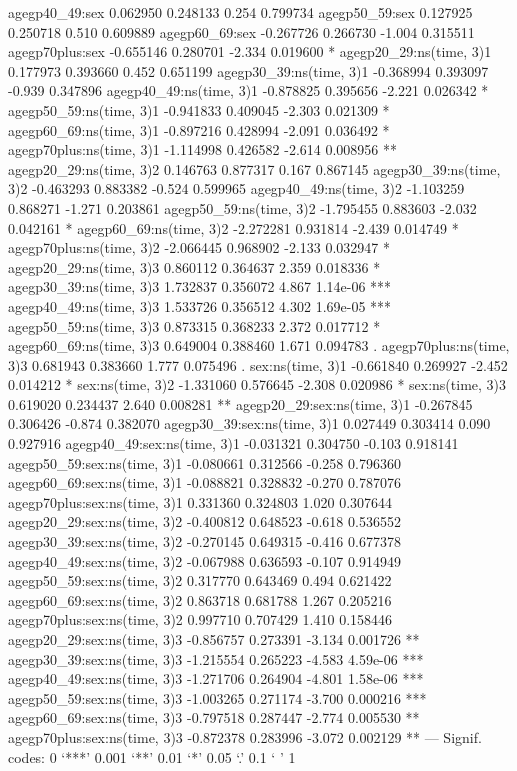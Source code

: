 \documentclass[a4paper]{article}                %
\begin{document}
\begin{Schunk}
\begin{Soutput}
agegp40_49:sex                  0.062950   0.248133   0.254 0.799734    
agegp50_59:sex                  0.127925   0.250718   0.510 0.609889    
agegp60_69:sex                 -0.267726   0.266730  -1.004 0.315511    
agegp70plus:sex                -0.655146   0.280701  -2.334 0.019600 *  
agegp20_29:ns(time, 3)1         0.177973   0.393660   0.452 0.651199    
agegp30_39:ns(time, 3)1        -0.368994   0.393097  -0.939 0.347896    
agegp40_49:ns(time, 3)1        -0.878825   0.395656  -2.221 0.026342 *  
agegp50_59:ns(time, 3)1        -0.941833   0.409045  -2.303 0.021309 *  
agegp60_69:ns(time, 3)1        -0.897216   0.428994  -2.091 0.036492 *  
agegp70plus:ns(time, 3)1       -1.114998   0.426582  -2.614 0.008956 ** 
agegp20_29:ns(time, 3)2         0.146763   0.877317   0.167 0.867145    
agegp30_39:ns(time, 3)2        -0.463293   0.883382  -0.524 0.599965    
agegp40_49:ns(time, 3)2        -1.103259   0.868271  -1.271 0.203861    
agegp50_59:ns(time, 3)2        -1.795455   0.883603  -2.032 0.042161 *  
agegp60_69:ns(time, 3)2        -2.272281   0.931814  -2.439 0.014749 *  
agegp70plus:ns(time, 3)2       -2.066445   0.968902  -2.133 0.032947 *  
agegp20_29:ns(time, 3)3         0.860112   0.364637   2.359 0.018336 *  
agegp30_39:ns(time, 3)3         1.732837   0.356072   4.867 1.14e-06 ***
agegp40_49:ns(time, 3)3         1.533726   0.356512   4.302 1.69e-05 ***
agegp50_59:ns(time, 3)3         0.873315   0.368233   2.372 0.017712 *  
agegp60_69:ns(time, 3)3         0.649004   0.388460   1.671 0.094783 .  
agegp70plus:ns(time, 3)3        0.681943   0.383660   1.777 0.075496 .  
sex:ns(time, 3)1               -0.661840   0.269927  -2.452 0.014212 *  
sex:ns(time, 3)2               -1.331060   0.576645  -2.308 0.020986 *  
sex:ns(time, 3)3                0.619020   0.234437   2.640 0.008281 ** 
agegp20_29:sex:ns(time, 3)1    -0.267845   0.306426  -0.874 0.382070    
agegp30_39:sex:ns(time, 3)1     0.027449   0.303414   0.090 0.927916    
agegp40_49:sex:ns(time, 3)1    -0.031321   0.304750  -0.103 0.918141    
agegp50_59:sex:ns(time, 3)1    -0.080661   0.312566  -0.258 0.796360    
agegp60_69:sex:ns(time, 3)1    -0.088821   0.328832  -0.270 0.787076    
agegp70plus:sex:ns(time, 3)1    0.331360   0.324803   1.020 0.307644    
agegp20_29:sex:ns(time, 3)2    -0.400812   0.648523  -0.618 0.536552    
agegp30_39:sex:ns(time, 3)2    -0.270145   0.649315  -0.416 0.677378    
agegp40_49:sex:ns(time, 3)2    -0.067988   0.636593  -0.107 0.914949    
agegp50_59:sex:ns(time, 3)2     0.317770   0.643469   0.494 0.621422    
agegp60_69:sex:ns(time, 3)2     0.863718   0.681788   1.267 0.205216    
agegp70plus:sex:ns(time, 3)2    0.997710   0.707429   1.410 0.158446    
agegp20_29:sex:ns(time, 3)3    -0.856757   0.273391  -3.134 0.001726 ** 
agegp30_39:sex:ns(time, 3)3    -1.215554   0.265223  -4.583 4.59e-06 ***
agegp40_49:sex:ns(time, 3)3    -1.271706   0.264904  -4.801 1.58e-06 ***
agegp50_59:sex:ns(time, 3)3    -1.003265   0.271174  -3.700 0.000216 ***
agegp60_69:sex:ns(time, 3)3    -0.797518   0.287447  -2.774 0.005530 ** 
agegp70plus:sex:ns(time, 3)3   -0.872378   0.283996  -3.072 0.002129 ** 
---
Signif. codes:  0 ‘***’ 0.001 ‘**’ 0.01 ‘*’ 0.05 ‘.’ 0.1 ‘ ’ 1


\end{Soutput}
\end{Schunk}
\end{document}
